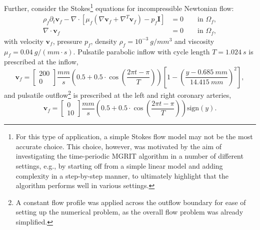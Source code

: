 \documentclass[3p]{elsarticle}
\begin{document}
Further, consider the Stokes\footnote{For this type of application,
a simple Stokes flow model may not be the most accurate choice.
This choice, however, was motivated by the aim of investigating the time-periodic MGRIT
algorithm in a number of different settings,
e.g., by starting off from a simple linear model and adding complexity
in a step-by-step manner, to ultimately highlight that the algorithm performs
well in various settings.}
equations for incompressible Newtonian flow:
\begin{align}
    \rho_f \partial_t \boldsymbol{v}_f
    - \nabla \cdot \left[ \mu_f \left( \nabla \boldsymbol{v}_f + \nabla^T \boldsymbol{v}_f \right) - p_f \boldsymbol{I} \right]
    &= 0 \qquad \text{in } \Omega_f, \label{se-model-stenosed-valve-momentum-eqn} \\
    \nabla \cdot \boldsymbol{v}_f
    &= 0 \qquad \text{in } \Omega_f,
    \label{se-model-stenosed-valve-divu-eqn}
\end{align}
with velocity $\boldsymbol{v}_f$,
pressure $p_f$,
density $\rho_f = 10^{-3}~g / mm^3$
and viscosity $\mu_f = 0.04~g / (mm \cdot s)$.
Pulsatile parabolic inflow with cycle length $T = 1.024~s$ is prescribed at the inflow,
\begin{equation}
    \boldsymbol{v}_f = \begin{bmatrix}
        200 \\
        0
    \end{bmatrix} \frac{mm}{s}
    \left( 0.5 + 0.5 \cdot \cos{\left( \frac{2 \pi t - \pi}{T} \right)} \right)
    \left[ 1 - \left( \frac{y - 0.685~mm}{14.415~mm} \right)^2 \right],
    \label{stenosed-valve-inflow-eqn}
\end{equation}
and pulsatile outflow\footnote{A constant flow profile was applied across the outflow boundary
for ease of setting up the numerical problem, as the overall flow problem was already simplified.}
is prescribed at the left and right coronary arteries,
\begin{equation}
    \boldsymbol{v}_f = \begin{bmatrix}
        0 \\
        10
    \end{bmatrix} \frac{mm}{s}
    \left( 0.5 + 0.5 \cdot \cos{\left( \frac{2 \pi t - \pi}{T} \right)} \right)
    \text{sign} (y).
    \label{stenosed-valve-outflow-eqn}
\end{equation}
\end{document}
